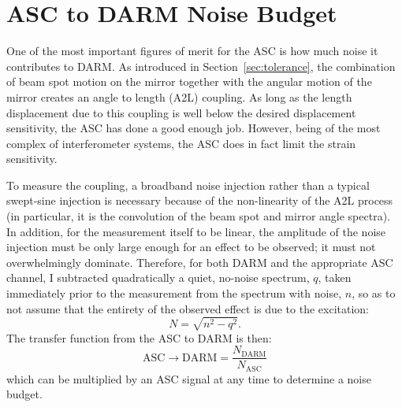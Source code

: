 \section{ASC to DARM Noise Budget}
\label{sec:asc2darm}
One of the most important figures of merit for the ASC is how much
noise it contributes to DARM. As introduced in
Section~\ref{sec:tolerance}, the combination of beam spot motion on
the mirror together with the angular motion of the mirror creates an
angle to length (A2L) coupling. As long as the length displacement due
to this coupling is well below the desired displacement sensitivity,
the ASC has done a good enough job. However, being of the most
complex of interferometer systems, the ASC does in fact limit the
strain sensitivity.

To measure the coupling, a broadband noise injection rather than a
typical swept-sine injection is necessary because of the non-linearity of the
A2L process (in particular, it is the convolution of the beam spot and
mirror angle spectra). In addition, for the measurement itself to be
linear, the amplitude of the noise injection must be only large enough
for an effect to be observed; it must not overwhelmingly
dominate. Therefore, for both DARM and the appropriate ASC channel, I
subtracted quadratically a quiet, no-noise spectrum, $q$, taken
immediately prior to the measurement from the spectrum with noise,
$n$, so as to not assume that the entirety of the observed effect is
due to the excitation:
\begin{equation}
N = \sqrt{n^2 - q^2}.
\end{equation}
The transfer function from the ASC to DARM is then:
\begin{equation}
\mathrm{ASC} \rightarrow \mathrm{DARM} = \frac{N_{\mathrm{DARM}}}{N_{\mathrm{ASC}}}
\end{equation}
which can be multiplied by an ASC signal at any time to determine a
noise budget.

